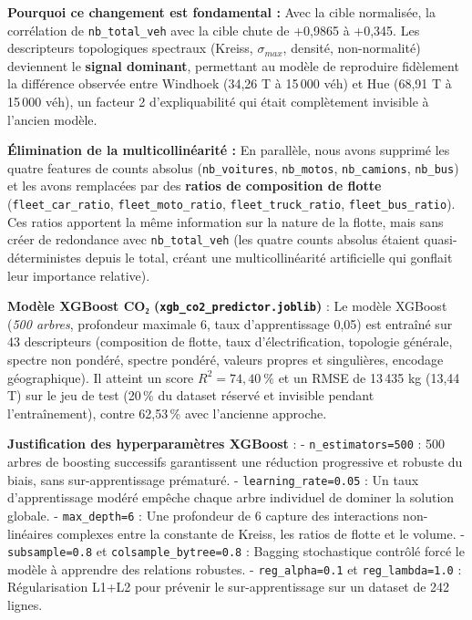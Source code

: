 \documentclass[10pt, a4paper]{article}
\begin{document}
\textbf{Pourquoi ce changement est fondamental :} Avec la cible
normalisée, la corrélation de \texttt{nb\_total\_veh} avec la cible
chute de +0,9865 à +0,345. Les descripteurs topologiques spectraux
(Kreiss, \(\sigma_{max}\), densité, non-normalité) deviennent le
\textbf{signal dominant}, permettant au modèle de reproduire fidèlement
la différence observée entre Windhoek (34,26 T à 15\,000 véh) et Hue
(68,91 T à 15\,000 véh), un facteur 2 d'expliquabilité qui était
complètement invisible à l'ancien modèle.

\textbf{Élimination de la multicollinéarité :} En parallèle, nous avons
supprimé les quatre features de counts absolus (\texttt{nb\_voitures},
\texttt{nb\_motos}, \texttt{nb\_camions}, \texttt{nb\_bus}) et les avons
remplacées par des \textbf{ratios de composition de flotte}
(\texttt{fleet\_car\_ratio}, \texttt{fleet\_moto\_ratio},
\texttt{fleet\_truck\_ratio}, \texttt{fleet\_bus\_ratio}). Ces ratios
apportent la même information sur la nature de la flotte, mais sans
créer de redondance avec \texttt{nb\_total\_veh} (les quatre counts
absolus étaient quasi-déterministes depuis le total, créant une
multicollinéarité artificielle qui gonflait leur importance relative).

\textbf{Modèle XGBoost CO₂ (\texttt{xgb\_co2\_predictor.joblib})} : Le
modèle XGBoost (\emph{500 arbres}, profondeur maximale 6, taux
d'apprentissage 0,05) est entraîné sur 43 descripteurs (composition de
flotte, taux d'électrification, topologie générale, spectre non pondéré,
spectre pondéré, valeurs propres et singulières, encodage géographique).
Il atteint un score \(R^2 = 74{,}40\ \%\) et un RMSE de 13\,435 kg
(13,44 T) sur le jeu de test (20\,\% du dataset réservé et invisible
pendant l'entraînement), contre 62,53\,\% avec l'ancienne approche.

\textbf{Justification des hyperparamètres XGBoost} : -
\texttt{n\_estimators=500} : 500 arbres de boosting successifs
garantissent une réduction progressive et robuste du biais, sans
sur-apprentissage prématuré. - \texttt{learning\_rate=0.05} : Un taux
d'apprentissage modéré empêche chaque arbre individuel de dominer la
solution globale. - \texttt{max\_depth=6} : Une profondeur de 6 capture
des interactions non-linéaires complexes entre la constante de Kreiss,
les ratios de flotte et le volume. - \texttt{subsample=0.8} et
\texttt{colsample\_bytree=0.8} : Bagging stochastique contrôlé forcé le
modèle à apprendre des relations robustes. - \texttt{reg\_alpha=0.1} et
\texttt{reg\_lambda=1.0} : Régularisation L1+L2 pour prévenir le
sur-apprentissage sur un dataset de 242 lignes.
\end{document}
